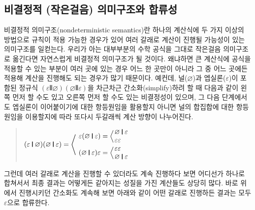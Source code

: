 \subsection{비결정적 (작은걸음) 의미구조와 합류성}
비결정적 의미구조(nondeterministic semantics)란 하나의 계산식에
두 가지 이상의 방법으로 규칙이 적용 가능한 경우가 있어 여러 갈래로
계산이 진행될 가능성이 있는 의미구조를 일컫는다. 우리가 아는
대부부분의 수학 공식을 그대로 작은걸음 의미구조로 옮긴다면 자연스럽게
비결정적 의미구조가 될 것이다. 왜냐하면 큰 계산식에 공식을 적용할 수 있는
부분이 여러 곳에 있는 경우 어느 한 곳만이 아니라 그 중 어느 곳에든
적용해 계산을 진행해도 되는 경우가 많기 때문이다. 예컨데,
널($\varnothing$)과 엡실론($\varepsilon$)이 포함된 정규식
$(\varepsilon\VERT \varnothing)(\varnothing\VERT \varepsilon)$을
차근차근 간소화(simplify)하려 할 때 다음과 같이 왼쪽 먼저 할 수도 있고
오른쪽 먼저 할 수도 있는 비결정성이 있으며, 그 다음 단계에서도
엡실론이 이어붙이기에 대한 항등원임을 활용할지 아니면
널의 합집합에 대한 항등원임을 이용할지에 따라 또다시
두갈래씩 계산 방향이 나누어진다.
\begin{quote}
\(
(\varepsilon\VERT \varnothing)(\varnothing\VERT \varepsilon) =
\left<\phantom{\begin{array}{l}.\\[4ex].\end{array}}\hspace*{-4ex}\right.
\begin{array}{l}
  \varepsilon(\varnothing\VERT \varepsilon) =
     \Big<\hspace*{-1ex}
     \begin{array}{l}
       \varnothing\VERT \varepsilon \\
       \varepsilon\varepsilon
     \end{array}
  \\[1ex]
  (\varnothing\VERT \varepsilon)\varepsilon =
     \Big<\hspace*{-1ex}
     \begin{array}{l}
      \varepsilon\varepsilon  \\
      \varnothing\VERT \varepsilon
     \end{array}
\end{array}
\)
\end{quote}
그런데 여러 갈래로 계산을 진행할 수 있더라도 계속 진행하다 보면
어디선가 하나로 합쳐서서 최종 결과는 어떻게든 같아지는 성질을 가진
계산들도 상당히 많다. 바로 위에서 진행시키던 간소화도 계속해 보면
아래와 같이 어떤 갈래로 진행하든 결과는 모두 $\varepsilon$으로
합류한다.
